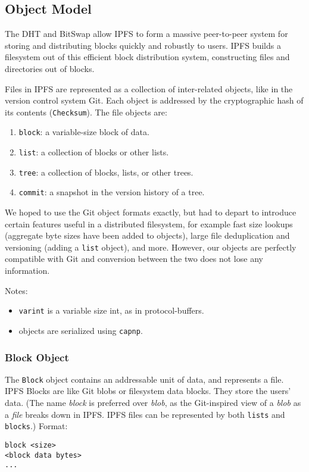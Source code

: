 \documentclass{sig-alternate}
\begin{document}

\subsection{Object Model}

The DHT and BitSwap allow IPFS to form a massive peer-to-peer system for storing
and distributing blocks quickly and robustly to users.
IPFS builds a filesystem out of this efficient block distribution system,
constructing files and directories out of blocks.

Files in IPFS are represented as a collection of inter-related objects, like in
the version control system Git. Each object is addressed by the cryptographic
hash of its contents (\texttt{Checksum}). The file objects are:

\begin{enumerate}
  \item \texttt{block}: a variable-size block of data.
  \item \texttt{list}: a collection of blocks or other lists.
  \item \texttt{tree}: a collection of blocks, lists, or other trees.
  \item \texttt{commit}: a snapshot in the version history of a tree.
\end{enumerate}

We hoped to use the Git object formats exactly, but had to depart to introduce
certain features useful in a distributed filesystem, for example fast size
lookups (aggregate byte sizes have been added to objects), large file
deduplication and versioning (adding a \texttt{list} object), and more.
However, our objects are perfectly compatible with Git and
conversion between the two does not lose any information.

Notes:
\begin{itemize}
  \item \texttt{varint} is a variable size int, as in protocol-buffers.
  \item objects are serialized using \texttt{capnp}.
\end{itemize}

\subsubsection{Block Object}

The \texttt{Block} object contains an addressable unit of data, and
represents a file.
IPFS Blocks are like Git blobs or filesystem data blocks. They store the
users' data. (The name \textit{block} is preferred over \textit{blob}, as the
Git-inspired view of a \textit{blob} as a \textit{file} breaks down in IPFS.
IPFS files can be represented by both \texttt{lists} and \texttt{blocks}.)
Format:
\begin{verbatim}
block <size>
<block data bytes>
...
\end{verbatim}
\end{document}
